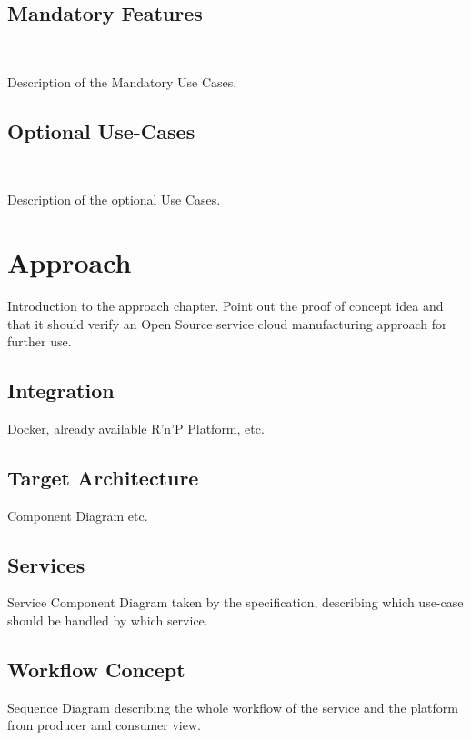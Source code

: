 \documentclass[
a4paper,
twoside,
bibliography=totoc,
headsepline,
cleardoublepage=empty,
parskip=half,
draft=false
]{scrbook}
\begin{document}
			\subsection{Mandatory Features} \label{subsec:mandatory}
				
				Description of the Mandatory Use Cases.
				
			\subsection{Optional Use-Cases} \label{subsec:optional}	
				
				Description of the optional Use Cases.
				
		\section{Approach} \label{sec:approach}
		
			Introduction to the approach chapter. Point out the proof of concept idea and that it should verify an Open Source service cloud manufacturing approach for further use.
		
			\subsection{Integration} \label{subsec:integration}
			
				Docker, already available R'n'P Platform, etc.
				
			\subsection{Target Architecture} \label{subsec:target_architecture}
			
				Component Diagram etc.
			
			\subsection{Services} \label{subsec:services}
			
				Service Component Diagram taken by the specification, describing which use-case should be handled by which service.
				
			\subsection{Workflow Concept} \label{subsec:workflow_concept}
			
				Sequence Diagram describing the whole workflow of the service and the platform from producer and consumer view.
				
\end{document}
